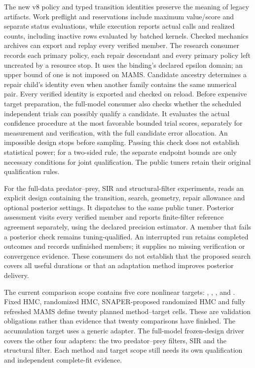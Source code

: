 The new v8 policy and typed transition identities preserve the meaning of
legacy artifacts. Work preflight and reservations include maximum value/score
and separate status evaluations, while execution reports actual calls and
realized counts, including inactive rows evaluated by batched kernels.
Checked mechanics archives can export and replay every verified member.
The research consumer
 records each primary
policy, each repair descendant and every primary policy left uncreated by a
resource stop. It uses the binding's declared epsilon domain; an upper bound
of one is not imposed on MAMS. Candidate ancestry determines a repair child's
identity even when another family contains the same numerical pair. Every
verified identity is exported and checked on reload.
Before expensive target preparation, the full-model consumer also checks
whether the scheduled independent trials can possibly qualify a candidate.
It evaluates the actual confidence procedure at the most favorable bounded
trial scores, separately for measurement and verification, with the full
candidate error allocation. An impossible design stops before sampling.
Passing this check does not establish statistical power; for a two-sided
rule, the separate endpoint bounds are only necessary conditions for joint
qualification. The public tuners retain their original qualification rules.

For the full-data predator--prey, SIR and structural-filter experiments,
 reads an explicit design
containing the transition, search, geometry, repair allowance and optional
posterior settings. It dispatches to the same public tuner. Posterior
assessment visits every verified member and reports finite-filter reference
agreement separately, using the declared precision estimator. A member that
fails a posterior check remains tuning-qualified. An interrupted run retains
completed outcomes and records unfinished members; it supplies no missing
verification or convergence evidence. These consumers do not establish that
the proposed search covers all useful durations or that an adaptation method
improves posterior delivery.

The current comparison scope contains five core nonlinear targets:
, , ,  and
. Fixed HMC, randomized HMC, SNAPER-proposed randomized HMC and
fully refreshed MAMS define twenty planned method--target cells. These are
validation obligations rather than evidence that twenty comparisons have
finished. The accumulation target uses a generic adapter. The full-model
frozen-design driver covers the other four adapters: the two predator--prey
filters, SIR and the structural filter. Each method and target scope still
needs its own qualification and independent complete-fit evidence.

